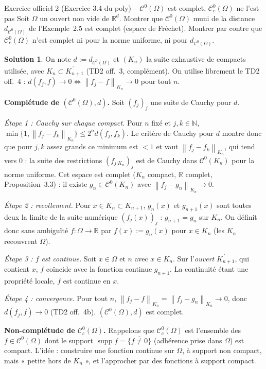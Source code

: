 \documentclass[11pt,a4paper]{article}
\newcommand{\R}{\mathbb{R}}
\newcommand{\N}{\mathbb{N}}
\newcommand{\interieur}[1]{\mathring{#1}}
\newcommand{\adh}[1]{\overline{#1}}
\newcommand{\norm}[1]{\left\|#1\right\|}
\newcommand{\Cz}{\mathcal{C}^0}
\newcommand{\Cc}{\mathcal{C}^0_c}
\DeclareMathOperator{\supp}{supp}
\theoremstyle{definition}
\newtheorem*{solution}{Solution}
\begin{document}
\begin{exo}{Exercice officiel 2 (Exercice 3.4 du poly) -- $\Cz(\Omega)$ est complet, $\Cc(\Omega)$ ne l'est pas}
Soit $\Omega$ un ouvert non vide de $\R^d$. Montrer que $\Cz(\Omega)$ muni de la distance $d_{\Cz(\Omega)}$ de l'Exemple~2.5 est complet (espace de Fréchet). Montrer par contre que $\Cc(\Omega)$ n'est complet ni pour la norme uniforme, ni pour $d_{\Cz(\Omega)}$.
\end{exo}

\begin{solution}
On note $d:=d_{\Cz(\Omega)}$ et $(K_n)$ la suite exhaustive de compacts utilisée, avec $K_n\subset\interieur{K_{n+1}}$ (TD2 off.~3, complément). On utilise librement le TD2 off.~4 : $d(f_j,f)\to0\iff\norm{f_j-f}_{K_n}\to0$ pour tout $n$.

\medskip
\noindent\textbf{Complétude de $(\Cz(\Omega),d)$.} Soit $(f_j)_j$ une suite de Cauchy pour $d$.

\emph{Étape 1 : Cauchy sur chaque compact.} Pour $n$ fixé et $j,k\in\N$, $\min\{1,\norm{f_j-f_k}_{K_n}\}\le2^nd(f_j,f_k)$. Le critère de Cauchy pour $d$ montre donc que pour $j,k$ assez grands ce minimum est $<1$ et vaut $\norm{f_j-f_k}_{K_n}$, qui tend vers $0$ : la suite des restrictions $(f_{j|K_n})_j$ est de Cauchy dans $\Cz(K_n)$ pour la norme uniforme. Cet espace est complet ($K_n$ compact, $\R$ complet, Proposition~3.3) : il existe $g_n\in\Cz(K_n)$ avec $\norm{f_j-g_n}_{K_n}\to0$.

\emph{Étape 2 : recollement.} Pour $x\in K_n\subset K_{n+1}$, $g_n(x)$ et $g_{n+1}(x)$ sont toutes deux la limite de la suite numérique $(f_j(x))_j$ : $g_{n+1}=g_n$ sur $K_n$. On définit donc sans ambiguïté $f:\Omega\to\R$ par $f(x):=g_n(x)$ pour $x\in K_n$ (les $K_n$ recouvrent $\Omega$).

\emph{Étape 3 : $f$ est continue.} Soit $x\in\Omega$ et $n$ avec $x\in K_n$. Sur l'\emph{ouvert} $\interieur{K_{n+1}}$, qui contient $x$, $f$ coïncide avec la fonction continue $g_{n+1}$. La continuité étant une propriété locale, $f$ est continue en $x$.

\emph{Étape 4 : convergence.} Pour tout $n$, $\norm{f_j-f}_{K_n}=\norm{f_j-g_n}_{K_n}\to0$, donc $d(f_j,f)\to0$ (TD2 off.~4b). $(\Cz(\Omega),d)$ est complet.

\medskip
\noindent\textbf{Non-complétude de $\Cc(\Omega)$.} Rappelons que $\Cc(\Omega)$ est l'ensemble des $f\in\Cz(\Omega)$ dont le support $\supp f=\adh{\{f\ne0\}}$ (adhérence prise dans $\Omega$) est compact. L'idée : construire une fonction continue sur $\Omega$, à support non compact, mais « petite hors de $K_n$ », et l'approcher par des fonctions à support compact.


\end{solution}
\end{document}
